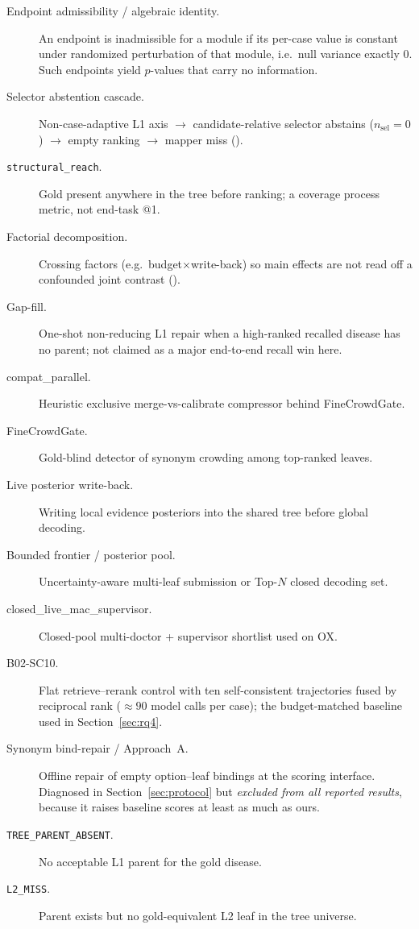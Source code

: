 \begin{description}
  \item[Endpoint admissibility / algebraic identity.] An endpoint is inadmissible for a module if its per-case value is constant under randomized perturbation of that module, i.e.\ null variance exactly $0$. Such endpoints yield $p$-values that carry no information.
  \item[Selector abstention cascade.] Non-case-adaptive L1 axis $\rightarrow$ candidate-relative selector abstains ($n_{\mathrm{sel}}{=}0$) $\rightarrow$ empty ranking $\rightarrow$ mapper miss ().
  \item[\texttt{structural\_reach}.] Gold present anywhere in the tree before ranking; a coverage process metric, not end-task @1.
  \item[Factorial decomposition.] Crossing factors (e.g.\ budget${\times}$write-back) so main effects are not read off a confounded joint contrast ().
  \item[Gap-fill.] One-shot non-reducing L1 repair when a high-ranked recalled disease has no parent; not claimed as a major end-to-end recall win here.
  \item[compat\_parallel.] Heuristic exclusive merge-vs-calibrate compressor behind FineCrowdGate.
  \item[FineCrowdGate.] Gold-blind detector of synonym crowding among top-ranked leaves.
  \item[Live posterior write-back.] Writing local evidence posteriors into the shared tree before global decoding.
  \item[Bounded frontier / posterior pool.] Uncertainty-aware multi-leaf submission or Top-$N$ closed decoding set.
  \item[closed\_live\_mac\_supervisor.] Closed-pool multi-doctor + supervisor shortlist used on OX.
  \item[B02-SC10.] Flat retrieve--rerank control with ten self-consistent trajectories fused by reciprocal rank ($\approx 90$ model calls per case); the budget-matched baseline used in Section~\ref{sec:rq4}.
  \item[Synonym bind-repair / Approach~A.] Offline repair of empty option--leaf bindings at the scoring interface. Diagnosed in Section~\ref{sec:protocol} but \emph{excluded from all reported results}, because it raises baseline scores at least as much as ours.
  \item[\texttt{TREE\_PARENT\_ABSENT}.] No acceptable L1 parent for the gold disease.
  \item[\texttt{L2\_MISS}.] Parent exists but no gold-equivalent L2 leaf in the tree universe.

\end{description}
